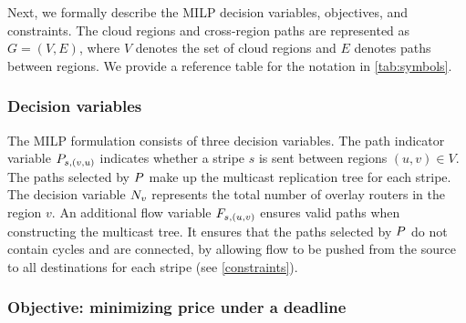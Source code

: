 Next, we formally describe the MILP decision variables, objectives, and constraints. The cloud regions and cross-region paths are represented as $G=(V, E)$, where $V$ denotes the set of cloud regions and $E$ denotes paths between regions. We provide a reference table for the notation in \cref{tab:symbols}.



\subsubsection{Decision variables}

The MILP formulation consists of three decision variables. The path indicator variable $P_{s, (v, u)}$ indicates whether a stripe $s$ is sent between regions $(u, v) \in V$. The paths selected by $P$ make up the multicast replication tree for each stripe. The decision variable $N_v$ represents the total number of overlay routers in the region $v$. An additional flow variable $F_{s, (u,v)}$ ensures valid paths when constructing the multicast tree. 
It ensures that the paths selected by $P$ do not contain cycles and are connected, by allowing flow to be pushed from the source to all destinations for each stripe (see \cref{constraints}).

\subsubsection{Objective: minimizing price under a deadline} \label{reduce_optimizer_runtime}

